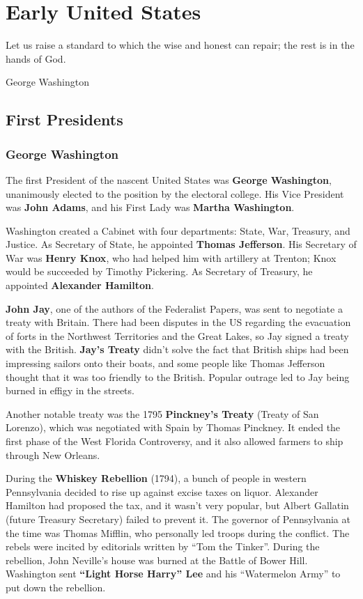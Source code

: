 \chapter{Early United States}

\epigraph{%
  Let us raise a standard to which the wise and honest can repair; the rest is in the hands of God.
}{George Washington}

\section{First Presidents}

\subsection*{George Washington}

The first President of the nascent United States was \textbf{George Washington},
unanimously elected to the position by the electoral college.
His Vice President was \textbf{John Adams},
and his First Lady was \textbf{Martha Washington}.

Washington created a Cabinet with four departments: State, War, Treasury, and Justice.
As Secretary of State, he appointed \textbf{Thomas Jefferson}.
His Secretary of War was \textbf{Henry Knox},
who had helped him with artillery at Trenton;
Knox would be succeeded by Timothy Pickering.
As Secretary of Treasury, he appointed \textbf{Alexander Hamilton}.

\textbf{John Jay}, one of the authors of the Federalist Papers,
was sent to negotiate a treaty with Britain.
There had been disputes in the US regarding the evacuation of forts in the Northwest Territories and the Great Lakes,
so Jay signed a treaty with the British.
\textbf{Jay's Treaty} didn't solve the fact that British ships had been impressing sailors onto their boats,
and some people like Thomas Jefferson thought that it was too friendly to the British.
Popular outrage led to Jay being burned in effigy in the streets.

Another notable treaty was the 1795 \textbf{Pinckney's Treaty} (Treaty of San Lorenzo),
which was negotiated with Spain by Thomas Pinckney.
It ended the first phase of the West Florida Controversy,
and it also allowed farmers to ship through New Orleans.

During the \textbf{Whiskey Rebellion} (1794),
a bunch of people in western Pennsylvania decided to rise up against excise taxes on liquor.
Alexander Hamilton had proposed the tax, and it wasn't very popular,
but Albert Gallatin (future Treasury Secretary) failed to prevent it.
The governor of Pennsylvania at the time was Thomas Mifflin, who personally led troops during the conflict.
The rebels were incited by editorials written by ``Tom the Tinker''.
During the rebellion, John Neville's house was burned at the Battle of Bower Hill.
Washington sent \textbf{``Light Horse Harry'' Lee} and his ``Watermelon Army'' to put down the rebellion.

